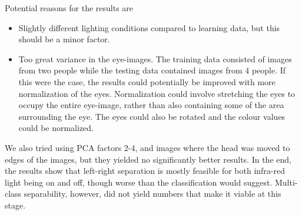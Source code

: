 Potential reasons for the results are
\begin{itemize}
	\item{Slightly different lighting conditions compared to learning data, but this should be a minor factor.}
	\item{Too great variance in the eye-images. 
		The training data consisted of images from two people while the testing data contained images from 4 people. 
		If this were the case, the results could potentially be improved with more normalization of the eyes. 
		Normalization could involve stretching the eyes to occupy the entire eye-image, rather than also containing some of the area surrounding the eye. 
		The eyes could also be rotated and the colour values could be normalized.}
\end{itemize}

We also tried using PCA factors 2-4, and images where the head was moved to edges of the images, but they yielded no significantly better results.
In the end, the results show that left-right separation is mostly feasible for both infra-red light being on and off, though worse than the classification would suggest.
Multi-class separability, however, did not yield numbers that make it viable at this stage.
